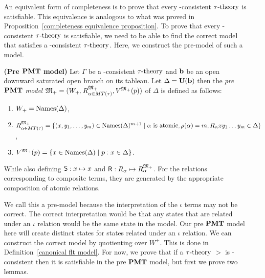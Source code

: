 \par An equivalent form of completeness is to prove that every \pmt-consistent $\tau\text{-theory}$ is satisfiable. This equivalence is analogous to what was proved in Proposition~\ref{completeness equivalence proposition}. To prove that every \pmt-consistent $\tau\text{-theory}$ is satisfiable, we need to be able to find the correct model that satisfies a \pmt-consistent $\tau\text{-theory}$. Here, we construct the pre-model of such a model. 



\begin{definition}\label{pre flt model}
    \textbf{(Pre $\textbf{PMT}$ model)} Let $\Gamma$ be a \pmt-consistent $\tau\text{-theory}$ and $\textbf{b}$ be an open downward saturated open branch on its tableau. Let $\Delta = \textbf{U}(\textbf{b})$ then the \textit{pre $\textbf{PMT}$ model} ${\mathfrak{M}_+}= (W_+,R^{{\mathfrak{M}_+}}_{\alpha\in MT(\tau)},V^{{\mathfrak{M}_+}}(p))$ of $\Delta$ is defined as follows:
    \begin{enumerate}
        \item $W_+=\text{Names}(\Delta)$,
        \item $R^{\mathfrak{M}_+}_{\alpha\in MT(\tau)} = \{(x,y_1,\ldots,y_m) \in \text{Names}(\Delta)^{m+1} \mid \alpha \text{ is atomic}, \rho(\alpha) = m, R_\alpha xy_1\ldots y_m\in\Delta\}$,
        \item $V^{\mathfrak{M}_+} (p) = \{x\in\text{Names}(\Delta)\mid p:x\in\Delta\}$.
    \end{enumerate}
    While also defining $\mathsf{S}:x\mapsto x$ and $\mathsf{R}: R_\alpha\mapsto R_\alpha^{\mathfrak{M}_+}$. For the relations corresponding to composite terms, they are generated by the appropriate composition of atomic relations. 
\end{definition}

\par We call this a pre-model because the interpretation of the $\iota$ terms may not be correct. The correct interpretation would be that any states that are related under an $\iota$ relation would be the same state in the model. Our pre $\textbf{PMT}$ model here will create distinct states for states related under an $\iota$ relation. We can construct the correct model by quotienting over $W^+$. This is done in Definition~\ref{canonical flt model}. For now, we prove that if a $\tau\text{-theory}$ $\gt$ is \pmt-consistent then it is satisfiable in the pre $\textbf{PMT}$ model, but first we prove two lemmas.  

